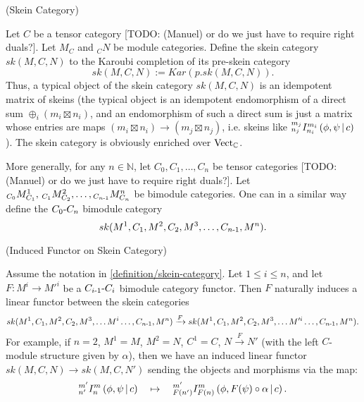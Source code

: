 \begin{definition}\label{definition/skein-category} (Skein Category)

  \noindent Let $C$ be a tensor category [TODO: (Manuel) or do we just have to require right duals?]. Let $M_{C}$ and $_{C}N$ be module
  categories. \quad Define the skein category $sk(M,C,N)$ to the Karoubi
  completion of its pre-skein category
  \[
    sk(M,C,N) := Kar(p.sk(M,C,N)).
  \]
  \noindent Thus, a typical object of the skein category $sk(M,C,N)$ is an
  idempotent matrix of skeins (the typical object is an idempotent
  endomorphism of a direct sum $\oplus_{i} (m_{i} \boxtimes n_{i})$, and an
  endomorphism of such a direct sum is just a matrix whose entries are maps
  $(m_{i} \boxtimes n_{i}) \to (m_{j} \boxtimes n_{j})$, i.e. skeins like
  ${}^{m_{j}}_{n_{j}} I^{m_{i}}_{n_{i}} \left( \phi, \psi \,\middle|\, c \right)$). The skein category is
  obviously enriched over $\operatorname{Vect}_{\mathbb{C}}$.

  More generally, for any $n \in \mathbb{N}$, let
  $C_{0}, C_{1}, \ldots, C_{n}$ be tensor categories [TODO: (Manuel) or do we just have to require right duals?]. Let
  ${}_{C_{0}}M^{1}_{C_{1}}, \, {}_{C_{1}}M^{2}_{C_{2}}, \ldots, {}_{C_{n{\text -}1}}M^{n}_{C_{n}}$
  be bimodule categories. One can in a similar way define the
  $C_{0}{\text -}C_{n}$ bimodule category
  \[
    sk(M^{1}, C_{1}, M^{2}, C_{2}, M^{3}, \ldots, C_{n{\text -}1}, M^{n}).
  \]
  \begin{center}
    
  \end{center}

\end{definition}

\begin{definition} \label{definition/induced-functor-on-skein-category} (Induced Functor on Skein Category)

  \noindent Assume the notation in \ref{definition/skein-category}. Let
  $1 \leq i \leq n$, and let $F: M^{i} \to M'^{i}$ be a
  $C_{i{\text -}1}{\text -}C_{i}$ bimodule category functor. \quad Then $F$
  naturally induces a linear functor between the skein categories
  \[
    sk(M^{1}, C_{1}, M^{2}, C_{2}, M^{3}, \ldots M^{i} \ldots, C_{n{\text -}1}, M^{n})
    \xrightarrow{F}
    sk(M^{1}, C_{1}, M^{2}, C_{2}, M^{3}, \ldots M'^{i} \ldots, C_{n{\text -}1}, M^{n}).
  \]
  For example, if $n=2$, $M^{1} = M$, $M^{2} = N$, $C^{1} = C$, $N \xrightarrow{F} N'$
  (with the left $C$-module structure given by $\alpha$), then we have an
  induced linear functor $sk(M,C,N) \to sk(M,C,N')$ sending the objects and morphisms via the map:
  \[
    {}^{m'}_{n'} I^{m}_{n} \left( \phi, \psi \,\middle|\, c \right)
    \quad \mapsto \quad
    {}^{m'}_{F(n')} I^{m}_{F(n)} \left( \phi, F(\psi) \circ \alpha \,\middle|\, c \right).
  \]
\end{definition}

